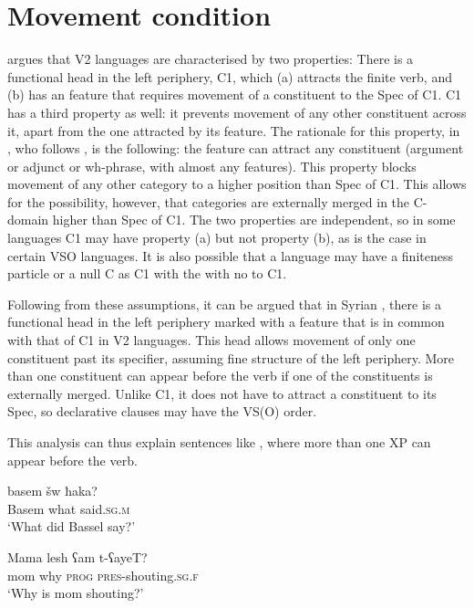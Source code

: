 \documentclass[output=paper]{LSP/langsci}
\begin{document}
\section{Movement condition}


\citet{Holmberg2014verbsecond} argues that V2 languages are characterised by two properties: There is a functional head in the left periphery, C1, which (a) attracts the finite verb, and (b) has an  feature that requires movement of a constituent to the Spec of C1. C1 has a third property as well: it prevents movement of any other constituent across it, apart from the one attracted by its  feature. The rationale for this property, in \citet{Holmberg2014verbsecond}, who follows \citet{Roberts2004}, is the following: the  feature can attract any constituent (argument or adjunct or wh-phrase, with almost any features). This property blocks movement of any other category to a higher position than Spec of C1. This allows for the possibility, however, that categories are externally merged in the C-domain higher than Spec of C1. The two properties are independent, so in some languages C1 may have property (a) but not property (b), as is the case in certain VSO languages. It is also possible that a language may have a finiteness particle or a null C as C1 with the  with no  to C1.

Following from these assumptions, it can be argued that in Syrian , there is a functional head in the left periphery marked with a feature that is in common with that of C1 in V2 languages. This head allows movement of only one constituent past its specifier, assuming  fine structure of the left periphery. More than one constituent can appear before the verb if one of the constituents is externally merged.\textsc{} Unlike C1, it does not have to attract a constituent to its Spec, so declarative clauses may have the VS(O) order.

This analysis can thus explain sentences like , where more than one XP can appear before the verb.


\ea%
\label{ex:sulaiman:10}
\ea \label{ex:sulaiman:10a}
\gll basem          šw                      ħaka?\\
 Basem      what      said.\textsc{sg.m}\\
\glt  ‘What did Bassel say?’

\ex  \label{ex:sulaiman:10b}
\gll Mama      lesh        ʕam                t-ʕayeT?\\
 mom              why        \textsc{prog}     \textsc{pres}-shouting.\textsc{sg.f}\\
\glt  ‘Why is mom shouting?’
\z
\z
\end{document}
